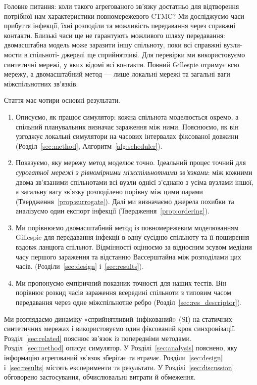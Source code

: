 Головне питання: коли такого агрегованого зв'язку достатньо для відтворення потрібної нам характеристики повномережевого CTMC? Ми досліджуємо часи прибуття інфекції, їхні розподіли та можливість передавання через справжні контакти. Близькі часи ще не гарантують можливого шляху
передавання: двомасштабна модель може заразити іншу спільноту, поки всі справжні вузли-мости в спільноті-
джерелі ще сприйнятливі. Для перевірки ми використовуємо синтетичні мережі, у яких відомі всі контакти.
Повний Gillespie отримує всю мережу, а двомасштабний метод — лише локальні мережі та загальні ваги
міжспільнотних зв’язків.

Стаття має чотири основні результати.
\begin{enumerate}
\item Описуємо, як працює симулятор: кожна спільнота моделюється окремо, а спільний планувальник визначає
зараження між ними. Пояснюємо, як він узгоджує локальні симулятори на часових інтервалах фіксованої довжини (Розділ~\ref{sec:method}, Алгоритм~\ref{alg:scheduler}).
\item Показуємо, яку мережу метод моделює точно. Ідеальний процес точний для \emph{сурогатної мережі з рівномірними міжспільнотними зв’язками}: між кожними двома зв’язаними спільнотами всі вузли однієї з’єднано з усіма вузлами іншої, а загальну вагу зв’язку розподілено порівну між цими парами (Твердження~\ref{prop:surrogate}). Далі ми визначаємо джерела похибки та аналізуємо один експорт інфекції (Твердження~\ref{prop:ordering}).
\item Ми порівнюємо двомасштабний метод із повномережевим моделюванням Gillespie для передавання інфекції в одну сусідню спільноту та її поширення вздовж ланцюга спільнот. Відмінності оцінюємо за відносним зсувом медіани часу першого зараження та відстанню Вассерштайна між розподілами цих часів.  (Розділи~\ref{sec:design} і~\ref*{sec:results}).
\item Ми пропонуємо емпіричний показник точності для наших тестів. Він порівнює розкид часів зараження всередині спільноти з типовим часом передавання через одне міжспільнотне ребро (Розділ~\ref*{sec:res_descriptor}).
\end{enumerate}

Ми розглядаємо динаміку «сприйнятливий--інфікований» (SI) на статичних синтетичних мережах і використовуємо один фіксований крок синхронізації. Розділ~\ref{sec:related} пояснює зв'язок із попередніми методами. Розділ~\ref{sec:method} описує симулятор. У Розділі~\ref{sec:analysis} пояснено, яку інформацію агрегований зв'язок зберігає та втрачає. Розділи~\ref{sec:design} і~\ref*{sec:results} містять експерименти та результати. У Розділі~\ref*{sec:discussion} обговорено застосування, обчислювальні витрати й обмеження.


